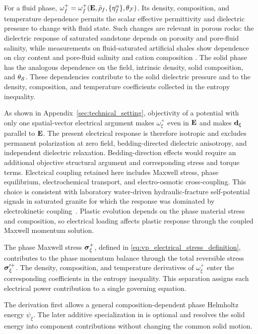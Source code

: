 For a fluid phase,
\(\omega_f^+=\omega_f^+(\mathbf{E},\bar\rho_f,\{\eta_f^\alpha\},\theta_{\mathcal{F}})\).
Its density, composition, and temperature dependence permits the scalar
effective permittivity and dielectric pressure to change with fluid state.
Such changes are relevant in porous rocks: the dielectric response of saturated
sandstone depends on porosity and pore-fluid salinity, while measurements on
fluid-saturated artificial shales show dependence on clay content and
pore-fluid salinity and cation composition
\cite{kirichek2018dielectric_sandstone,beloborodov2017dielectric_shales}.
The solid phase has the analogous dependence on the field, intrinsic density,
solid composition, and \(\theta_{\mathcal{S}}\).  These dependencies contribute to the
solid dielectric pressure and to the density, composition, and temperature
coefficients collected in the entropy inequality.

As shown in Appendix~\ref{sec:technical_setting}, objectivity of a potential with only
one spatial-vector electrical argument makes \(\omega_\xi^+\) even in
\(\mathbf{E}\) and makes \(\mathbf{d}_\xi\) parallel to \(\mathbf{E}\).  The present
electrical response is therefore isotropic and excludes permanent polarization
at zero field, bedding-directed dielectric anisotropy, and independent
dielectric relaxation.  Bedding-direction effects would require an additional
objective structural argument and corresponding stress and torque terms.
Electrical coupling retained here includes Maxwell stress, phase equilibrium,
electrochemical transport, and electro-osmotic cross-coupling.  This choice is
consistent with laboratory water-driven hydraulic-fracture self-potential
signals in saturated granite for which the response was dominated by
electrokinetic coupling~\cite{moore2007self_potential}.  Plastic evolution
depends on the phase material stress and composition, so electrical loading
affects plastic response through the coupled Maxwell momentum solution.

The phase Maxwell stress \(\boldsymbol{\sigma}_\xi^{+}\), defined in
\eqref{eq:vp_electrical_stress_definition}, contributes to the phase momentum
balance through the total reversible stress
\(\boldsymbol{\sigma}_\xi^{\prime+}\).  The density, composition, and temperature
derivatives of \(\omega^{+}_{\xi}\) enter the corresponding coefficients in the
entropy inequality.  This separation assigns each electrical power contribution
to a single governing equation.

The derivation first allows a general composition-dependent phase Helmholtz
energy \(\psi_\xi\).  The later additive specialization in
 is optional and resolves the solid
energy into component contributions without changing the common solid motion.

